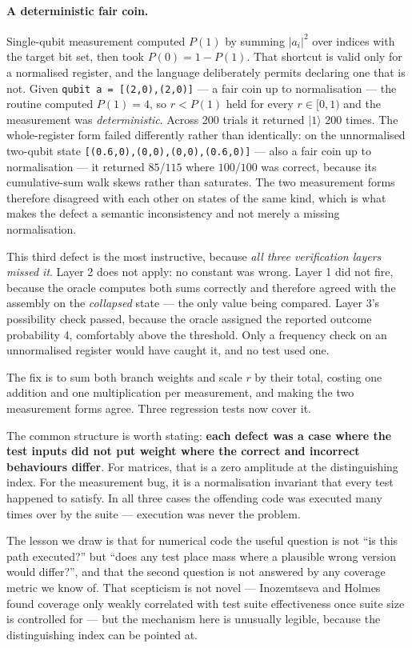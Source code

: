 \documentclass[11pt]{article}
\newcommand{\ket}[1]{\ensuremath{|#1\rangle}}
\begin{document}
\paragraph{A deterministic fair coin.} Single-qubit measurement computed $P(1)$ by summing
$|a_i|^2$ over indices with the target bit set, then took $P(0) = 1 - P(1)$. That shortcut
is valid only for a normalised register, and the language deliberately permits declaring one
that is not. Given \texttt{qubit a = [(2,0),(2,0)]} --- a fair coin up to normalisation ---
the routine computed $P(1) = 4$, so $r < P(1)$ held for every $r \in [0,1)$ and the
measurement was \emph{deterministic}. Across 200 trials it returned \ket{1} 200 times.
The whole-register form failed differently rather than identically: on the unnormalised
two-qubit state \texttt{[(0.6,0),(0,0),(0,0),(0.6,0)]} --- also a fair coin up to
normalisation --- it returned $85$/$115$ where $100$/$100$ was correct, because its
cumulative-sum walk skews rather than saturates. The two measurement forms therefore
disagreed with each other on states of the same kind, which is what makes the defect a
semantic inconsistency and not merely a missing normalisation.

This third defect is the most instructive, because \emph{all three verification layers
missed it}. Layer 2 does not apply: no constant was wrong. Layer 1 did not fire, because the
oracle computes both sums correctly and therefore agreed with the assembly on the
\emph{collapsed} state --- the only value being compared. Layer 3's possibility check
passed, because the oracle assigned the reported outcome probability 4, comfortably above
the threshold. Only a frequency check on an unnormalised register would have caught it, and
no test used one.

The fix is to sum both branch weights and scale $r$ by their total, costing one addition and
one multiplication per measurement, and making the two measurement forms agree. Three
regression tests now cover it.

The common structure is worth stating: \textbf{each defect was a case where the test inputs
did not put weight where the correct and incorrect behaviours differ}. For matrices, that
is a zero amplitude at the distinguishing index. For the measurement bug, it is a
normalisation invariant that every test happened to satisfy. In all three cases the
offending code was executed many times over by the suite --- execution was never the
problem.

The lesson we draw is that for numerical code the useful question is not ``is this path
executed?'' but ``does any test place mass where a plausible wrong version would differ?'',
and that the second question is not answered by any coverage metric we know of. That
scepticism is not novel --- Inozemtseva and Holmes~\cite{inozemtseva2014} found coverage
only weakly correlated with test suite effectiveness once suite size is controlled for ---
but the mechanism here is unusually legible, because the distinguishing index can be
pointed at.
\end{document}
